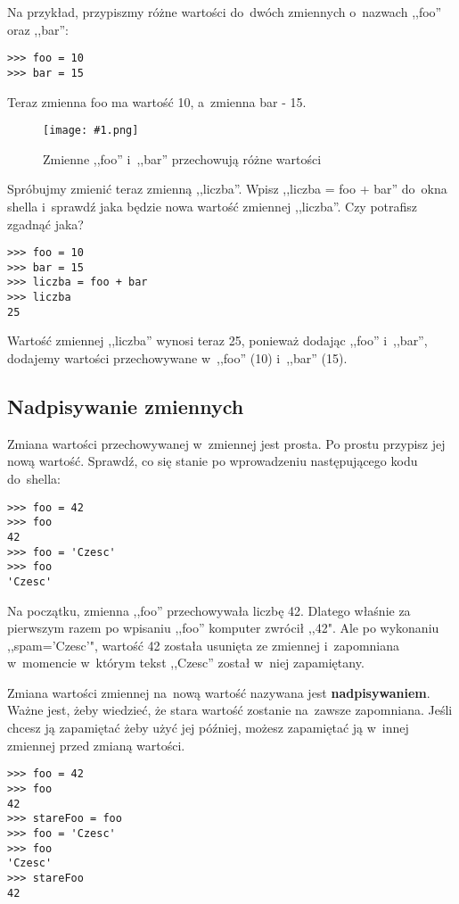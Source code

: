 \documentclass{book}
\newcommand{\img}[3]{
\begin{figure}
\centerline{
	\texttt{[image: \#1.png]}
}
\caption{#2}
\label{#1}
\end{figure}
}
\begin{document}
Na przykład, przypiszmy różne wartości do~dwóch zmiennych o~nazwach ,,foo'' oraz ,,bar'':

\begin{lstlisting}
>>> foo = 10
>>> bar = 15
\end{lstlisting}

Teraz zmienna foo ma wartość 10, a~zmienna bar - 15.

\img{idle-zmienne}{Zmienne ,,foo'' i~,,bar'' przechowują różne wartości}{10 cm}

Spróbujmy zmienić teraz zmienną ,,liczba''. Wpisz ,,liczba = foo + bar'' do~okna shella i~sprawdź jaka będzie nowa wartość zmiennej ,,liczba''. Czy potrafisz zgadnąć jaka?

\begin{lstlisting}
>>> foo = 10
>>> bar = 15
>>> liczba = foo + bar
>>> liczba
25
\end{lstlisting}

Wartość zmiennej ,,liczba'' wynosi teraz 25, ponieważ dodając ,,foo'' i~,,bar'', dodajemy wartości przechowywane w~,,foo'' (10) i~,,bar'' (15).

\subsection{Nadpisywanie zmiennych}

Zmiana wartości przechowywanej w~zmiennej jest prosta. Po prostu przypisz jej nową wartość. Sprawdź, co się stanie po wprowadzeniu następującego kodu do~shella:

\begin{lstlisting}
>>> foo = 42
>>> foo
42
>>> foo = 'Czesc'
>>> foo
'Czesc'
\end{lstlisting}

Na początku, zmienna ,,foo'' przechowywała liczbę 42. Dlatego właśnie za pierwszym razem po wpisaniu ,,foo'' komputer zwrócił ,,42". Ale po wykonaniu ,,spam='Czesc'", wartość 42 została usunięta ze zmiennej i~zapomniana w~momencie w~którym tekst ,,Czesc'' został w~niej zapamiętany.

Zmiana wartości zmiennej na~nową wartość nazywana jest {\bf nadpisywaniem}. Ważne jest, żeby wiedzieć, że stara wartość zostanie na~zawsze zapomniana. Jeśli chcesz ją zapamiętać żeby użyć jej później, możesz zapamiętać ją w~innej zmiennej przed zmianą wartości.

\begin{lstlisting}
>>> foo = 42
>>> foo
42
>>> stareFoo = foo
>>> foo = 'Czesc'
>>> foo
'Czesc'
>>> stareFoo
42
\end{lstlisting}
\end{document}
